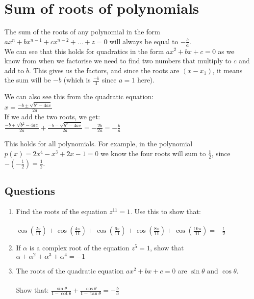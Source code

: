\documentclass[../main.tex]{subfiles}
\begin{document}
\section{Sum of roots of polynomials}
The sum of the roots of any polynomial in the form \(ax^n+bx^{n-1}+cx^{n-2}+...+z=0\) will always be equal to \(-\frac{b}{a}\).\\

We can see that this holds for quadratics in the form \(ax^2+bx+c=0\) as we know from when we factorise we need to find two numbers that multiply to \(c\) and add to \(b\). This gives us the factors, and since the roots are \((x-x_1)\), it means the sum will be \(-b\) (which is \(\frac{-b}{1}\) since \(a=1\) here).\\
\begin{spacing}{1.5}
\noindent We can also see this from the quadratic equation:\\
\(x=\frac{-b\pm\sqrt{b^2-4ac}}{2a}\)\\
If we add the two roots, we get:\\
\(\frac{-b+\sqrt{b^2-4ac}}{2a}+\frac{-b-\sqrt{b^2-4ac}}{2a}=-\frac{2b}{2a}=-\frac{b}{a}\)\\
\end{spacing}
\noindent This holds for all polynomials. For example, in the polynomial \(p(x)=2x^4-x^3+2x-1=0\) we know the four roots will sum to \(\frac{1}{2}\), since \(-(-\frac{1}{2})=\frac{1}{2}\).\\

\pagebreak

\subsection*{Questions}
\label{Sum of roots}
\begin{enumerate}
    \item Find the roots of the equation \(z^{11}=1\). Use this to show that:\\ \\
    \(\cos{(\frac{2\pi}{11})}+\cos{(\frac{4\pi}{11})+\cos{(\frac{6\pi}{11})+\cos{(\frac{8\pi}{11})+\cos{(\frac{10\pi}{11})=-\frac{1}{2}}}}}\)\\
    \item If \(\alpha\) is a complex root of the equation \(z^5=1 \), show that \(\alpha+\alpha^2+\alpha^3+\alpha^4=-1\)
    \item The roots of the quadratic equation \(ax^2+bx+c=0\) are \(\sin{\theta}\text{ and } \cos{\theta}\).\\ \\
    Show that: \(\frac{\sin{\theta}}{1-\cot{\theta}}+\frac{\cos{\theta}}{1-\tan{\theta}}=-\frac{b}{a}\)
\end{enumerate}
\end{document}
